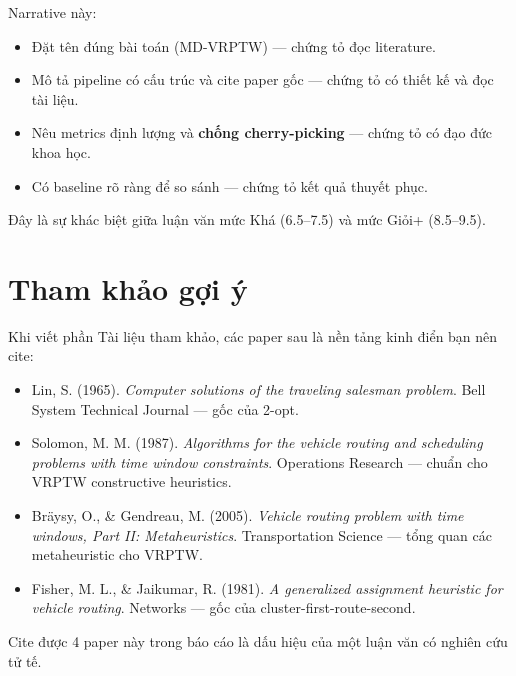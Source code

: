 \documentclass[12pt,a4paper]{report}
\begin{document}
Narrative này:
\begin{itemize}
    \item Đặt tên đúng bài toán (MD-VRPTW) --- chứng tỏ đọc literature.
    \item Mô tả pipeline có cấu trúc và cite paper gốc --- chứng tỏ có thiết kế và đọc tài liệu.
    \item Nêu metrics định lượng và \textbf{chống cherry-picking} --- chứng tỏ có đạo đức khoa học.
    \item Có baseline rõ ràng để so sánh --- chứng tỏ kết quả thuyết phục.
\end{itemize}

Đây là sự khác biệt giữa luận văn mức Khá (6.5--7.5) và mức Giỏi+ (8.5--9.5).

\section{Tham khảo gợi ý}

Khi viết phần Tài liệu tham khảo, các paper sau là nền tảng kinh điển bạn nên cite:

\begin{itemize}[leftmargin=*]
    \item Lin, S. (1965). \textit{Computer solutions of the traveling salesman problem}. Bell System Technical Journal --- gốc của 2-opt.
    \item Solomon, M. M. (1987). \textit{Algorithms for the vehicle routing and scheduling problems with time window constraints}. Operations Research --- chuẩn cho VRPTW constructive heuristics.
    \item Bräysy, O., \& Gendreau, M. (2005). \textit{Vehicle routing problem with time windows, Part II: Metaheuristics}. Transportation Science --- tổng quan các metaheuristic cho VRPTW.
    \item Fisher, M. L., \& Jaikumar, R. (1981). \textit{A generalized assignment heuristic for vehicle routing}. Networks --- gốc của cluster-first-route-second.
\end{itemize}

Cite được 4 paper này trong báo cáo là dấu hiệu của một luận văn có nghiên cứu tử tế.
\end{document}
